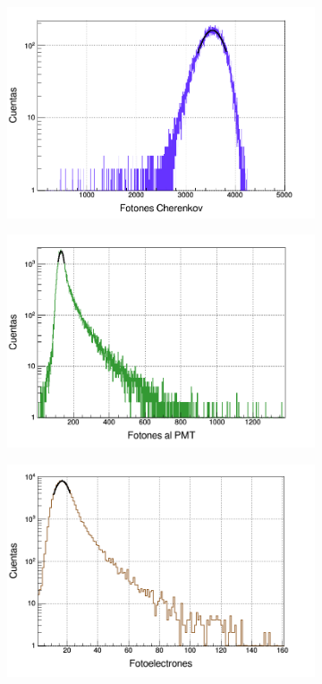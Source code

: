 \documentclass[12pt,oneside,openany,letter]{book}
\begin{document}
\begin{figure}[h!]
    \centering
    \begin{subfigure}{0.45\textwidth}
        \includegraphics[width=\textwidth]{cherenkov_total_e.png}
        \caption{}
        \label{cherenkov_total_e}
    \end{subfigure}
    \begin{subfigure}{0.45\textwidth}
        \includegraphics[width=\textwidth]{al_pmt_e.png}
        \caption{}
        \label{al_pmt_e}
    \end{subfigure}
    \begin{subfigure}{0.45\textwidth}
        \includegraphics[width=\textwidth]{fotoelectrones_vee.png}

\end{subfigure}
\end{figure}
\end{document}
